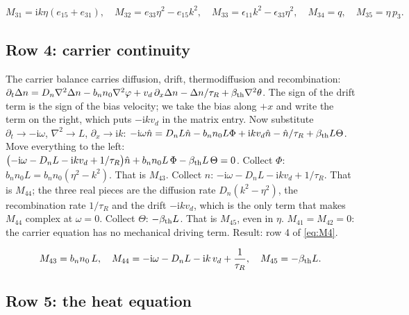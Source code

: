 \documentclass[11pt]{article}
\makeatletter
\newif\ifshowworked
\newenvironment{worked}{%
  \ifshowworked\par\smallskip\noindent\textit{Working.}\par\smallskip\else
  \setbox\z@\vbox\bgroup\fi}{\ifshowworked\par\smallskip\else\egroup\fi}
\newcommand{\ii}{\mathrm{i}}
\makeatother
\begin{document}
\begin{equation}\label{eq:M3}
M_{31}=\ii k\eta(e_{15}+e_{31}),\quad
M_{32}=e_{33}\eta^2-e_{15}k^2,\quad
M_{33}=\epsilon_{11}k^2-\epsilon_{33}\eta^2,\quad
M_{34}=q,\quad
M_{35}=\eta\,p_3 .
\label{eq:M3}
\end{equation}

\subsection*{Row 4: carrier continuity}

\begin{worked}
The carrier balance carries diffusion, drift, thermodiffusion and recombination:
$\partial_t\Delta n=D_n\nabla^2\Delta n-b_nn_0\nabla^2\varphi+v_d\,\partial_x\Delta n
-\Delta n/\tau_R+\beta_{\rm th}\nabla^2\theta$. The sign of the drift term is the sign of the bias
velocity; we take the bias along $+x$ and write the term on the right, which puts $-\ii kv_d$ in the
matrix entry. Now substitute $\partial_t\to-\ii\omega$, $\nabla^2\to L$, $\partial_x\to\ii k$:
$-\ii\omega\hat n=D_nL\hat n-b_nn_0L\Phi+\ii kv_d\hat n-\hat n/\tau_R+\beta_{\rm th}L\Theta$.
Move everything to the left:
$\bigl(-\ii\omega-D_nL-\ii kv_d+1/\tau_R\bigr)\hat n+b_nn_0L\,\Phi-\beta_{\rm th}L\,\Theta=0$.
Collect $\Phi$: $b_nn_0L=b_nn_0(\eta^2-k^2)$. That is $M_{43}$.
Collect $\hat n$: $-\ii\omega-D_nL-\ii kv_d+1/\tau_R$. That is $M_{44}$; the three real pieces are
the diffusion rate $D_n(k^2-\eta^2)$, the recombination rate $1/\tau_R$ and the drift $-\ii kv_d$,
which is the only term that makes $M_{44}$ complex at $\omega=0$.
Collect $\Theta$: $-\beta_{\rm th}L$. That is $M_{45}$, even in $\eta$.
$M_{41}=M_{42}=0$: the carrier equation has no mechanical driving term. Result: row 4 of \eqref{eq:M4}.
\end{worked}

\begin{equation}\label{eq:M4}
M_{43}=b_nn_0\,L,\quad
M_{44}=-\ii\omega-D_nL-\ii k\,v_d+\frac{1}{\tau_R},\quad
M_{45}=-\beta_{\rm th}L .
\label{eq:M4}
\end{equation}

\subsection*{Row 5: the heat equation}
\end{document}
